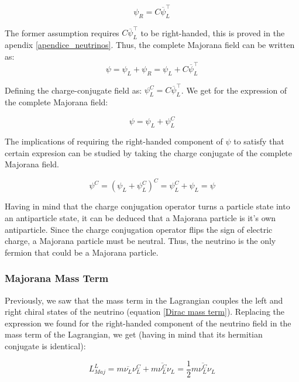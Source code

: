 \begin{equation}
\psi_R = C \overline{\psi}^\intercal_L
\end{equation}

The former assumption requires $C \overline{\psi}^\intercal_L$ to be right-handed, this is proved in the apendix \ref{apendice_neutrinos}. Thus, the complete Majorana 
field can be written as:
\begin{equation}
\psi = \psi_L + \psi_R = \psi_L + C \overline{\psi}^\intercal_L
\end{equation}

Defining the charge-conjugate field as: $\psi^C_L = C \overline{\psi}^\intercal_L$. We get for the expression of the complete Majorana field:

\begin{equation}
\psi = \psi_L + \psi^C_L
\end{equation}

The implications of requiring the right-handed component of $\psi$ to satisfy that certain expresion can be studied by taking the charge conjugate of the complete Majorana field. 

\begin{equation}
\psi^C = (\psi_L + \psi^C_L)^C = \psi^C_L + \psi_L = \psi
\end{equation}

Having in mind that the charge conjugation operator turns a particle state into an antiparticle state, it can be deduced that a Majorana particle is it's own antiparticle.
Since the charge conjugation operator flips the sign of electric charge, a Majorana particle must be neutral. Thus, the neutrino is the only fermion that could be a Majorana particle.

\subsubsection{Majorana Mass Term}

Previously, we saw that the mass term in the Lagrangian couples the left and right chiral states of the neutrino (equation \ref{Dirac mass term}). Replacing the 
expression we found for the right-handed component of the neutrino field in the mass term of the Lagrangian, we get (having in mind that its hermitian conjugate 
is identical):


\begin{equation}
L_{Maj}^{L} = m \overline{\nu_L} \nu_L^C + m \overline{\nu_L^C} \nu_L = \frac{1}{2} m \overline{\nu_L^{C}} \nu_L
\end{equation}

